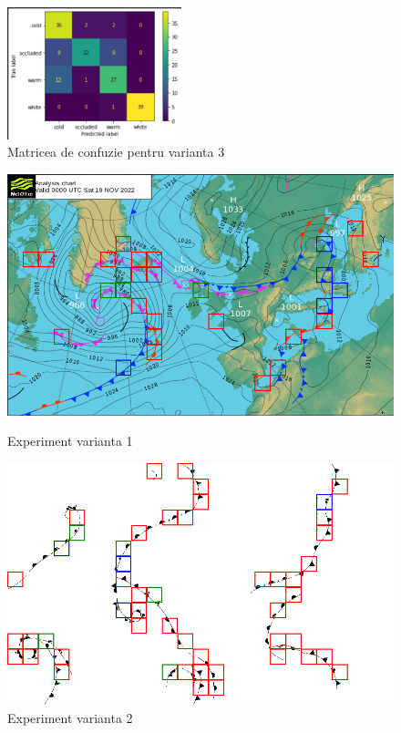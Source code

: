 \documentclass{article}
\begin{document}
 \begin{figure}[!htb]
  \centering
  \includegraphics[width=0.45\textwidth]{model_v3_confusion_matrix.png}
  \caption{Matricea de confuzie pentru varianta 3}
\end{figure}

\newpage
  \begin{figure}[!htb]
    \begin{minipage}{0.45\textwidth}
      \centering
      \includegraphics[width=1\linewidth]{model_v1_colored_output.png}
      \caption{Experiment varianta 1}\label{Fig:Cold1}
    \end{minipage}\hfill
    \begin{minipage}{0.45\textwidth}
      \centering
      \includegraphics[width=1\linewidth]{model_v2_bw_output.png}
      \caption{Experiment varianta 2}\label{Fig:Cold2}
    \end{minipage}
 \end{figure}
\end{document}
